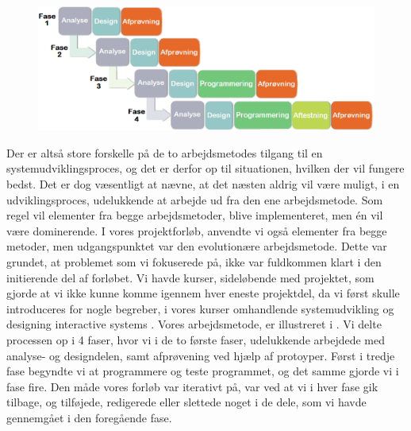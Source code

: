 \begin{figure}[ht]
	\centering
	\includegraphics[scale=0.5]{billeder/blandingsmetode.png}
  	\label{fig:blandingsmetode}
\end{figure}

Der er altså store forskelle på de to arbejdsmetodes tilgang til en systemudviklingsproces, og det er derfor op til situationen, hvilken der vil fungere bedst. Det er dog væsentligt at nævne, at det næsten aldrig vil være muligt, i en udviklingsproces, udelukkende at arbejde ud fra den ene arbejdsmetode. Som regel vil elementer fra begge arbejdsmetoder, blive implementeret, men én vil være dominerende. I vores projektforløb, anvendte vi også elementer fra begge metoder, men udgangspunktet var den evolutionære arbejdsmetode. Dette var grundet, at problemet som vi fokuserede på, ikke var fuldkommen klart i den initierende del af forløbet. Vi havde kurser, sideløbende med projektet, som gjorde at vi ikke kunne komme igennem hver eneste projektdel, da vi først skulle introduceres for nogle begreber, i vores kurser omhandlende systemudvikling \cite{ooad} og designing interactive systems \cite{deb}. Vores arbejdsmetode, er illustreret i . Vi delte processen op i 4 faser, hvor vi i de to første faser, udelukkende arbejdede med analyse- og designdelen, samt afprøvening ved hjælp af protoyper. Først i tredje fase begyndte vi at programmere og teste programmet, og det samme gjorde vi i fase fire. Den måde vores forløb var iterativt på, var ved at vi i hver fase gik tilbage, og tilføjede, redigerede eller slettede noget i de dele, som vi havde gennemgået i den foregående fase.

